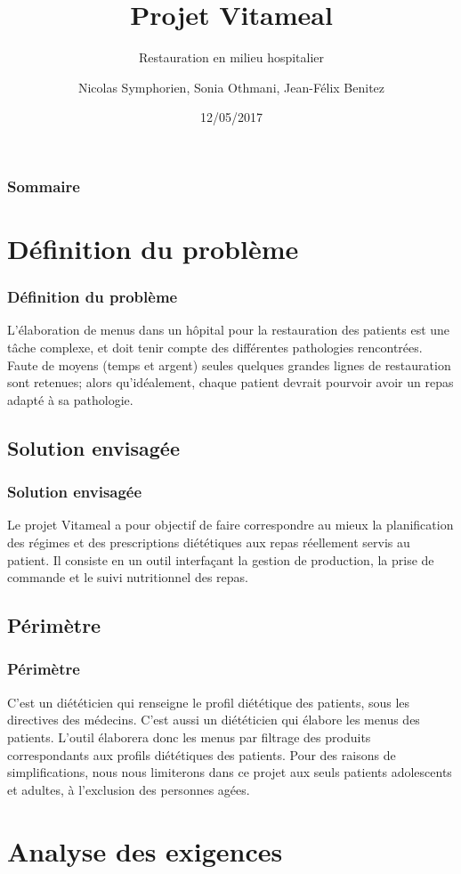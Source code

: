 \documentclass{beamer}
\title{Projet Vitameal}
\subtitle{Restauration en milieu hospitalier}
\author{Nicolas Symphorien, Sonia Othmani, Jean-Félix Benitez}
\institute{CNAM}
\date{12/05/2017}
\begin{document}
\begin{frame}[plain]
  \titlepage
\end{frame}

\begin{frame}
  \frametitle{Sommaire}
  \tableofcontents
\end{frame}

\section{Définition du problème}
\begin{frame}[label=definitionDuProbleme]
\frametitle{Définition du problème}
L'élaboration de menus dans un hôpital pour la restauration des patients
est une tâche complexe, et doit tenir compte des différentes pathologies
rencontrées. Faute de moyens (temps et argent) seules quelques grandes
lignes de restauration sont retenues; alors qu'idéalement, chaque
patient devrait pourvoir avoir un repas adapté à sa pathologie.
\end{frame}

\subsection{Solution envisagée}
\begin{frame}[label=solutionEnvisagée]
\frametitle{Solution envisagée}
Le projet Vitameal a pour objectif de faire correspondre au mieux la planification des régimes et des
prescriptions diététiques aux repas réellement servis au patient. Il consiste en un outil interfaçant la
gestion de production, la prise de commande et le suivi nutritionnel des repas.
\end{frame}

\subsection{Périmètre}
\begin{frame}[label=perimetre]
\frametitle{Périmètre}
C'est un diététicien qui renseigne le profil diététique des patients,
sous les directives des médecins. C'est aussi un diététicien qui élabore
les menus des patients. L'outil élaborera donc
les menus par filtrage des produits correspondants aux profils
diététiques des patients. Pour des raisons de simplifications, nous nous limiterons dans ce projet aux seuls patients adolescents et adultes, à l'exclusion des personnes agées.
\end{frame}

\section{Analyse des exigences}
\end{document}
